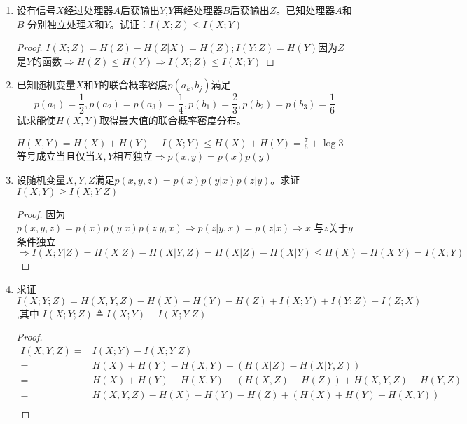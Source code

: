 \documentclass[a4paper]{article}
\begin{document}
\begin{enumerate}
\begin{proof}
$I(X;Y|Z)=H(X|Z)-H(X|Y,Z)\leq H(X|Z)\leq H(X)\leq \log(2)=1$
所以等号全都成立$\Rightarrow X\sim B(\frac{1}{2})$。
同理可知$Y\sim B(\frac{1}{2})$。
另外$H(Y|Z)=H(Y)\Rightarrow I(Y;Z)=0\Rightarrow H(Z|Y)=H(Z)$
\begin{align*}
&H(X|Y,Z)=0 \\
\iff &H(X,Y,Z)=H(Y,Z)\\
\iff &H(X,Y)+H(Z|X,Y)=H(Y)+H(Z|Y)\\
\iff &2+H(Z|X,Y)=1+H(Z)\\
\iff &H(Z)=1+H(Z|X,Y)
\end{align*}
由上式推出$H(Z)\geq 1$,又$H(Z)\leq 1\Rightarrow H(Z)=1\Rightarrow H(X,Y,Z)=2$
\end{proof}


\item
设有信号$X$经过处理器$A$后获输出$Y$,$Y$再经处理器$B$后获输出$Z$。已知处理器$A$和$B$
分别独立处理$X$和$Y$。试证：$I(X;Z)\leq I(X;Y)$
\begin{proof}
$I(X;Z)=H(Z)-H(Z|X)=H(Z);I(Y;Z)=H(Y)$因为$Z$是$Y$的函数$\Rightarrow H(Z)\leq H(Y) \Rightarrow I(X;Z)\leq I(X;Y)$
\end{proof}
\item 已知随机变量$X$和$Y$的联合概率密度$p(a_k,b_j)$满足
$$
p(a_1)=\frac{1}{2},p(a_2)=p(a_3)=\frac{1}{4},p(b_1)=\frac{2}{3},p(b_2)=p(b_3)=\frac{1}{6}
$$
试求能使$H(X,Y)$取得最大值的联合概率密度分布。
\begin{solution}
$H(X,Y)=H(X)+H(Y)-I(X;Y)\leq H(X)+H(Y)=\frac{7}{6}+\log 3$
等号成立当且仅当$X,Y$相互独立$\Rightarrow p(x,y)=p(x)p(y)$
\end{solution}
\item 设随机变量$X,Y,Z$满足$p(x,y,z)=p(x)p(y|x)p(z|y)$。求证$I(X;Y)\geq I(X;Y|Z)$
\begin{proof}
因为$p(x,y,z)=p(x)p(y|x)p(z|y,x)\Rightarrow p(z|y,x)=p(z|x)\Rightarrow x$ 与$z$关于$y$条件独立$\Rightarrow I(X;Y|Z)=H(X|Z)-H(X|Y,Z)= H(X|Z)-H(X|Y)\leq H(X)-H(X|Y) =I(X;Y)$
\end{proof}
\item 求证$I(X;Y;Z)=H(X,Y,Z)-H(X)-H(Y)-H(Z)+I(X;Y)+I(Y;Z)+I(Z;X)$,其中
$I(X;Y;Z)\triangleq I(X;Y)-I(X;Y|Z)$
\begin{proof}
\begin{align*}
I(X;Y;Z) =& I(X;Y)-I(X;Y|Z) \\
=& H(X)+H(Y)-H(X,Y)-(H(X|Z)-H(X|Y,Z))\\
=& H(X)+H(Y)-H(X,Y)-(H(X,Z)-H(Z))+H(X,Y,Z)-H(Y,Z)\\
=& H(X,Y,Z)-H(X)-H(Y)-H(Z)+(H(X)+H(Y)-H(X,Y))\\

\end{align*}
\end{proof}
\end{enumerate}
\end{document}
